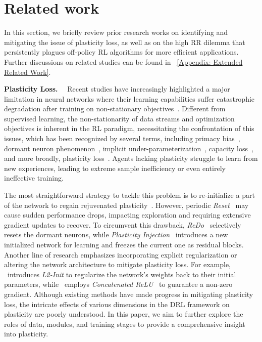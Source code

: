 \section{\textbf{Related work}}
In this section, we briefly review prior research works on identifying and mitigating the issue of plasticity loss, as well as on the high RR dilemma that persistently plagues off-policy RL algorithms for more efficient applications.
Further discussions on related studies can be found in \Appendix~\ref{Appendix: Extended Related Work}.

\textbf{Plasticity Loss.}~~
Recent studies have increasingly highlighted a major limitation in neural networks where their learning capabilities suffer catastrophic degradation after training on non-stationary objectives~\citep{dormant_neuron, Plasticity_Injection}.
Different from supervised learning, the non-stationarity of data streams and optimization objectives is inherent in the RL paradigm, necessitating the confrontation of this issues, which has been recognized by several terms, including primacy bias~\citep{primacy_bias}, dormant neuron phenomenon~\citep{dormant_neuron}, implicit under-parameterization~\citep{implicit_under-parameterization}, capacity loss~\citep{capacity_loss}, and more broadly, plasticity loss~\citep{understanding_plasticity, Regenerative_Regularization}.
Agents lacking plasticity struggle to learn from new experiences, leading to extreme sample inefficiency or even entirely ineffective training.

The most straightforward strategy to tackle this problem is to re-initialize a part of the network to regain rejuvenated plasticity~\citep{primacy_bias,breaking_RR_barrier,BBF}.
However, periodic \textit{Reset}~\citep{primacy_bias} may cause sudden performance drops, impacting exploration and requiring extensive gradient updates to recover.
To circumvent this drawback, \textit{ReDo}~\citep{dormant_neuron} selectively resets the dormant neurons, while \textit{Plasticity Injection}~\citep{Plasticity_Injection} introduces a new initialized network for learning and freezes the current one as residual blocks.
Another line of research emphasizes incorporating explicit regularization or altering the network architecture to mitigate plasticity loss.
For example, \cite{Regenerative_Regularization}~introduces \textit{L2-Init} to regularize the network's weights back to their initial parameters, while \cite{plasticity_loss_CRL}~employs \textit{Concatenated ReLU}~\citep{shang2016understanding} to guarantee a non-zero gradient.
Although existing methods have made progress in mitigating plasticity loss, the intricate effects of various dimensions in the DRL framework on plasticity are poorly understood.
In this paper, we aim to further explore the roles of data, modules, and training stages to provide a comprehensive insight into plasticity.

